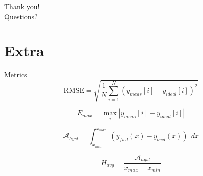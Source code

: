 \documentclass{beamer}
\begin{document}
    \begin{emptyframe}
        Thank you!\\Questions?
    \end{emptyframe}

\section*{Extra}

    \begin{frame}{Metrics}
        \centering
        $$\text{RMSE} = \sqrt{ \frac{1}{N} \sum_{i=1}^{N} \left( y_{meas}[i] - y_{ideal}[i] \right)^2 }$$

        $$E_{max} = \max_{i} \left| y_{meas}[i] - y_{ideal}[i] \right|$$

        $$\mathcal{A}_{hyst} = \int_{x_{min}}^{x_{max}} \left| \left( y_{fwd}(x) - y_{bwd}(x) \right) \right|\, dx $$

        $$H_{avg} = \frac{\mathcal{A}_{hyst}}{x_{max} - x_{min}}$$
    \end{frame}
\end{document}
